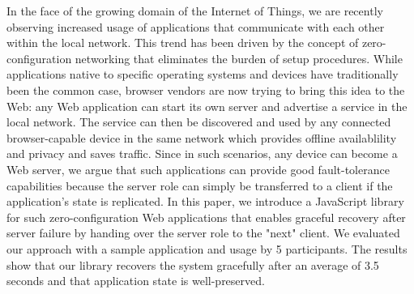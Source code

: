 In the face of the growing domain of the Internet of Things, we are recently observing increased usage of applications that communicate with each other within the local network. This trend has been driven by the concept of zero-configuration networking that eliminates the burden of setup procedures. While applications native to specific operating systems and devices have traditionally been the common case, browser vendors are now trying to bring this idea to the Web: any Web application can start its own server and advertise a service in the local network. The service can then be discovered and used by any connected browser-capable device in the same network which provides offline availablility and privacy and saves traffic. Since in such scenarios, any device can become a Web server, we argue that such applications can provide good fault-tolerance capabilities because the server role can simply be transferred to a client if the application's state is replicated. In this paper, we introduce a JavaScript library for such zero-configuration Web applications that enables graceful recovery after server failure by handing over the server role to the "next" client. We evaluated our approach with a sample application and usage by 5 participants. The results show that our library recovers the system gracefully after an average of 3.5 seconds and that application state is well-preserved.